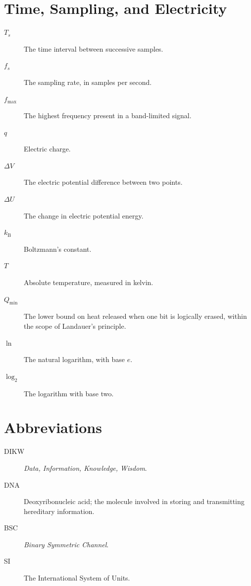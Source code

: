 \section*{Time, Sampling, and Electricity}

\begin{description}
  \item[\(T_s\)] The time interval between successive samples.
  \item[\(f_s\)] The sampling rate, in samples per second.
  \item[\(f_{\max}\)] The highest frequency present in a band-limited signal.
  \item[\(q\)] Electric charge.
  \item[\(\Delta V\)] The electric potential difference between two points.
  \item[\(\Delta U\)] The change in electric potential energy.
  \item[\(k_{\mathrm B}\)] Boltzmann's constant.
  \item[\(T\)] Absolute temperature, measured in kelvin.
  \item[\(Q_{\min}\)] The lower bound on heat released when one bit is logically erased, within the scope of Landauer's principle.
  \item[\(\ln\)] The natural logarithm, with base \(e\).
  \item[\(\log_2\)] The logarithm with base two.
\end{description}

\section*{Abbreviations}

\begin{description}
  \item[DIKW] \textit{Data, Information, Knowledge, Wisdom}.
  \item[DNA] Deoxyribonucleic acid; the molecule involved in storing and transmitting hereditary information.
  \item[BSC] \textit{Binary Symmetric Channel}.
  \item[SI] The International System of Units.
\end{description}
